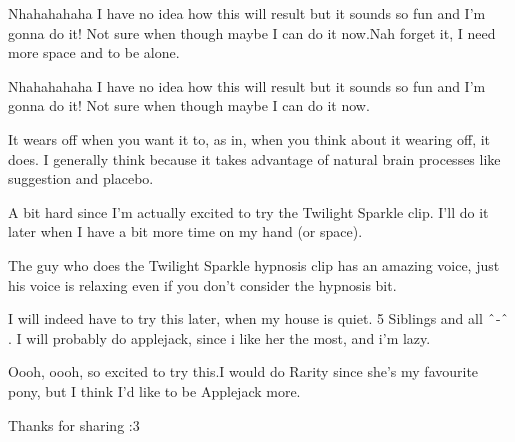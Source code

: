 \documentclass[ebook,12pt,oneside,openany]{memoir}
\newcommand{\carat}{$\char`\^$}
\newcommand{\mytexttilde}{\raisebox{0.5ex}{\texttildelow}}
\begin{document}
\begin{tcolorbox}[title=Kamarat]
\par{Nhahahahaha I have no idea how this will result but it sounds so fun and I'm gonna do it! Not sure when though maybe I can do it now.Nah forget it, I need more space and to be alone.}
\end{tcolorbox}
\begin{tcolorbox}[title=Harmonic Revelations,colback=brown!5!white,colframe=brown!75!black,coltitle=white]
\begin{tcolorbox}[title=Hitpony]
\par{Nhahahahaha I have no idea how this will result but it sounds so fun and I'm gonna do it! Not sure when though maybe I can do it now.}
\end{tcolorbox}
\par{It wears off when you want it to, as in, when you think about it wearing off, it does. I generally think because it takes advantage of natural brain processes like suggestion and placebo.}
\newline{}
\begin{tcolorbox}[title=\mytexttilde{}Lawfully Chaotic Xidphel\mytexttilde{}]
\par{A bit hard since I'm actually excited to try the Twilight Sparkle clip. I'll do it later when I have a bit more time on my hand (or space).}
\end{tcolorbox}
\par{The guy who does the Twilight Sparkle hypnosis clip has an amazing voice, just his voice is relaxing even if you don't consider the hypnosis bit.}
\end{tcolorbox}
\begin{tcolorbox}[title=The Original,colback=green!5!white,colframe=green!75!black,coltitle=white]
\par{I will indeed have to try this later, when my house is quiet. 5 Siblings and all \carat{}-\carat{}. I will probably do applejack, since i like her the most, and i'm lazy.}
\end{tcolorbox}
\begin{tcolorbox}[title=Peeds]
\par{Oooh, oooh, so excited to try this.I would do Rarity since she's my favourite pony, but I think I'd like to be Applejack more.}
\par{Thanks for sharing :3}
\end{tcolorbox}
\end{document}
